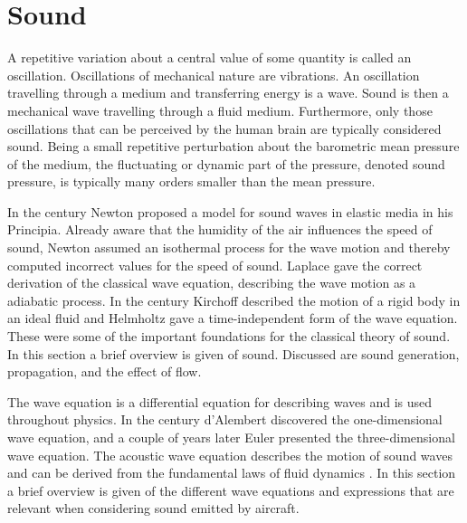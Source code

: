 \section{Sound}

A repetitive variation about a central value of some quantity is called an
oscillation. Oscillations of mechanical nature are vibrations. An
oscillation travelling through a medium and transferring energy is a wave. Sound
is then a mechanical wave travelling through a fluid medium. Furthermore, only
those oscillations that can be perceived by the human brain are typically
considered sound.
Being a small repetitive perturbation about the barometric
mean pressure of the medium, the fluctuating or dynamic part of the pressure,
denoted sound pressure, is typically many orders smaller than the mean
pressure.

In the  century Newton proposed a model for sound waves in elastic media
in his Principia. Already aware that the humidity of the air influences the
speed of sound, Newton assumed an isothermal process for the wave motion and
thereby computed incorrect values for the speed of sound. Laplace gave the
correct derivation of the classical wave equation, describing the wave motion as
a adiabatic process. In the  century Kirchoff described the motion of a
rigid body in an ideal fluid and Helmholtz gave a time-independent form of the
wave equation. These were some of the important foundations for the classical
theory of sound.
In this section a brief overview is given of sound. Discussed are sound
generation, propagation, and the effect of flow.

The wave equation is a differential equation for describing waves and is used
throughout physics. In the  century d'Alembert discovered the
one-dimensional wave equation, and a couple of years later Euler presented the
three-dimensional wave equation. The acoustic wave equation describes the motion
of sound waves and can be derived from the fundamental laws of fluid dynamics \cite{Arntzen2014a, Rienstra2017}.
In this section a brief overview is given of the different wave equations and
expressions that are relevant when considering sound emitted by aircraft.

